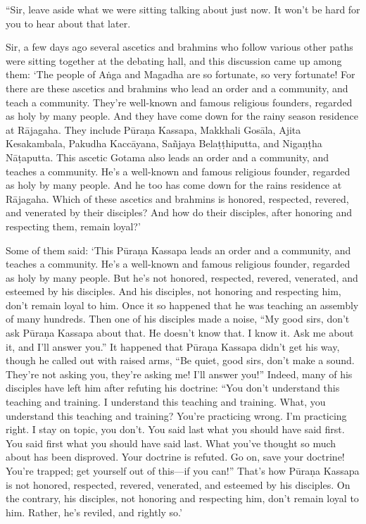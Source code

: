 \documentclass[12pt,openany]{book}%
\begin{document}
“Sir, leave aside what we were sitting talking about just now. It won’t be hard for you to hear about that later. 

Sir, a few days ago several ascetics and brahmins who follow various other paths were sitting together at the debating hall, and this discussion came up among them: ‘The people of \textsanskrit{Aṅga} and Magadha are so fortunate, so very fortunate! For there are these ascetics and brahmins who lead an order and a community, and teach a community. They’re well-known and famous religious founders, regarded as holy by many people. And they have come down for the rainy season residence at \textsanskrit{Rājagaha}. They include \textsanskrit{Pūraṇa} Kassapa, Makkhali \textsanskrit{Gosāla}, Ajita Kesakambala, Pakudha \textsanskrit{Kaccāyana}, \textsanskrit{Sañjaya} \textsanskrit{Belaṭṭhiputta}, and \textsanskrit{Nigaṇṭha} \textsanskrit{Nāṭaputta}. This ascetic Gotama also leads an order and a community, and teaches a community. He’s a well-known and famous religious founder, regarded as holy by many people. And he too has come down for the rains residence at \textsanskrit{Rājagaha}. Which of these ascetics and brahmins is honored, respected, revered, and venerated by their disciples? And how do their disciples, after honoring and respecting them, remain loyal?’ 

Some of them said: ‘This \textsanskrit{Pūraṇa} Kassapa leads an order and a community, and teaches a community. He’s a well-known and famous religious founder, regarded as holy by many people. But he’s not honored, respected, revered, venerated, and esteemed by his disciples. And his disciples, not honoring and respecting him, don’t remain loyal to him. Once it so happened that he was teaching an assembly of many hundreds. Then one of his disciples made a noise, “My good sirs, don’t ask \textsanskrit{Pūraṇa} Kassapa about that. He doesn’t know that. I know it. Ask me about it, and I’ll answer you.” It happened that \textsanskrit{Pūraṇa} Kassapa didn’t get his way, though he called out with raised arms, “Be quiet, good sirs, don’t make a sound. They’re not asking you, they’re asking me! I’ll answer you!” Indeed, many of his disciples have left him after refuting his doctrine: “You don’t understand this teaching and training. I understand this teaching and training. What, you understand this teaching and training? You’re practicing wrong. I’m practicing right. I stay on topic, you don’t. You said last what you should have said first. You said first what you should have said last. What you’ve thought so much about has been disproved. Your doctrine is refuted. Go on, save your doctrine! You’re trapped; get yourself out of this—if you can!” That’s how \textsanskrit{Pūraṇa} Kassapa is not honored, respected, revered, venerated, and esteemed by his disciples. On the contrary, his disciples, not honoring and respecting him, don’t remain loyal to him. Rather, he’s reviled, and rightly so.’ 
\end{document}
